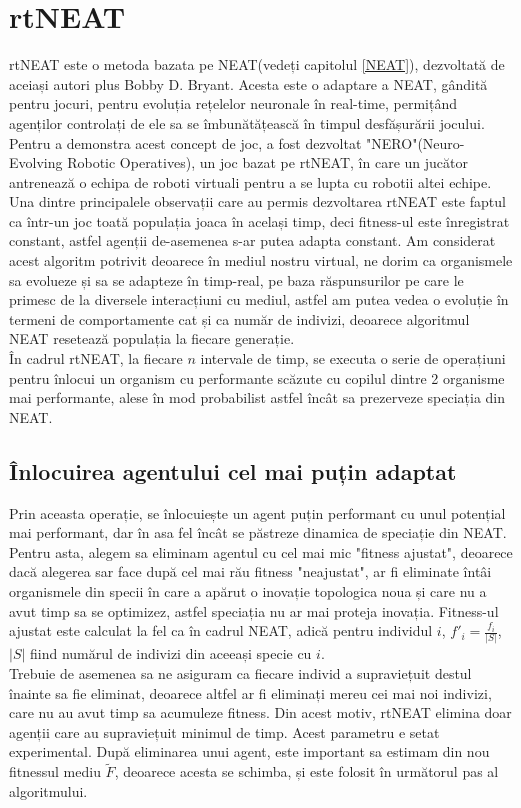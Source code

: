 \chapter{rtNEAT}\label{rtNEAT}

rtNEAT este o metoda bazata pe NEAT(vedeți capitolul \ref*{NEAT}), dezvoltată de aceiași autori plus Bobby D. Bryant\cite*{rtNEAT}.
Acesta este o adaptare a NEAT, gândită pentru jocuri, pentru evoluția rețelelor neuronale în real-time, permițând agenților controlați de ele sa se îmbunătățească în timpul desfășurării jocului.
Pentru a demonstra acest concept de joc, a fost dezvoltat "NERO"(Neuro-Evolving Robotic Operatives)\cite*{NERO}, un joc bazat pe rtNEAT, în care un jucător antrenează o echipa de roboti virtuali pentru a se lupta cu robotii altei echipe.
Una dintre principalele observații care au permis dezvoltarea rtNEAT este faptul ca într-un joc toată populația joaca în același timp, deci fitness-ul este înregistrat constant, astfel agenții de-asemenea s-ar putea adapta constant.
Am considerat acest algoritm potrivit deoarece în mediul nostru virtual, ne dorim ca organismele sa evolueze și sa se adapteze în timp-real, pe baza răspunsurilor pe care le primesc de la diversele interacțiuni cu mediul, astfel am putea vedea o evoluție în termeni de comportamente cat și ca număr de indivizi, deoarece algoritmul NEAT resetează populația la fiecare generație.
\\
În cadrul rtNEAT, la fiecare $n$ intervale de timp, se executa o serie de operațiuni pentru înlocui un organism cu performante scăzute cu copilul dintre 2 organisme mai performante, alese în mod probabilist astfel încât sa prezerveze speciația din NEAT.

\section{Înlocuirea agentului cel mai puțin adaptat}
Prin aceasta operație, se înlocuiește un agent puțin performant cu unul potențial mai performant, dar în asa fel încât se păstreze dinamica de speciație din NEAT.
Pentru asta, alegem sa eliminam agentul cu cel mai mic "fitness ajustat", deoarece dacă alegerea sar face după cel mai rău fitness "neajustat", ar fi eliminate întâi organismele din specii în care a apărut o inovație topologica noua și care nu a avut timp sa se optimizez, astfel speciația nu ar mai proteja inovația.
Fitness-ul ajustat este calculat la fel ca în cadrul NEAT, adică pentru individul $i$, $f\prime_i = \frac{f_i}{|S|}$, $|S|$ fiind numărul de indivizi din aceeași specie cu $i$.
\\
Trebuie de asemenea sa ne asiguram ca fiecare individ a supraviețuit destul înainte sa fie eliminat, deoarece altfel ar fi eliminați mereu cei mai noi indivizi, care nu au avut timp sa acumuleze fitness.
Din acest motiv, rtNEAT elimina doar agenții care au supraviețuit minimul de timp. Acest parametru e setat experimental.
După eliminarea unui agent, este important sa estimam din nou fitnessul mediu $\tilde{F}$, deoarece acesta se schimba, și este folosit în următorul pas al algoritmului.

